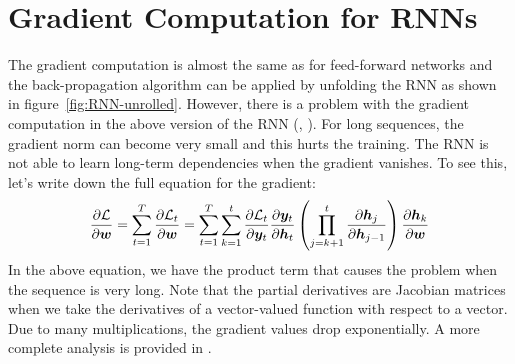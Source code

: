 	\section{Gradient Computation for RNNs}\label{sec:gradient_computation_RNN}
		The gradient computation is almost the same as for feed-forward networks and the back-propagation algorithm can be applied by unfolding the RNN as shown in figure~\ref{fig:RNN-unrolled}.
		However, there is a problem with the gradient computation in the above version of the RNN (\cite{pascanu2013difficulty}, \cite{bengio1994learning}).
		For long sequences, the gradient norm can become very small and this hurts the training.
		The RNN is not able to learn long-term dependencies when the gradient vanishes.
		To see this, let's write down the full equation for the gradient:
		\begin{equation}\label{eq:gradient_computation_RNN}
			\frac{\partial \mathcal{L}}{\partial \bm{w}}
			= \sum_{t=1}^{T} 
				\frac{\partial \mathcal{L}_t}{\partial \bm{w}}
			= \sum_{t=1}^{T} 
				\sum_{k=1}^{t} 
					\frac{\partial \mathcal{L}_t}{\partial \bm{y}_t}
					\frac{\partial \bm{y}_t}{\partial \bm{h}_t}
					\left(
						\prod_{j=k+1}^{t} \frac{\partial \bm{h}_j}{\partial \bm{h}_{j-1}}
					\right)
					\frac{\partial \bm{h}_{k}}{\partial \bm{w}}
		\end{equation}
		In the above equation, we have the product term that causes the problem when the sequence is very long.
		Note that the partial derivatives are Jacobian matrices when we take the derivatives of a vector-valued function with respect to a vector.
		Due to many multiplications, the gradient values drop exponentially.
		A more complete analysis is provided in \cite{pascanu2013difficulty}.
		
